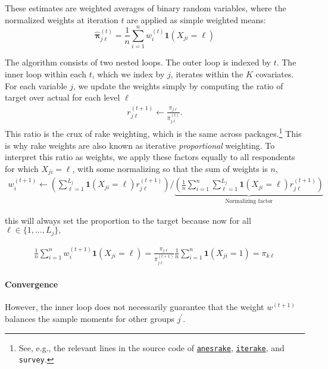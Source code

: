 \documentclass[11pt]{article}
\begin{document}
These estimates are weighted averages of binary random variables, where the normalized weights at iteration \(t\) are applied as simple weighted means:
\[\bm{\widehat{\pi}}^{(t)}_{j\ell} = \frac{1}{n}\sum^n_{i=1}w_i^{(t)} \mathbf{1}(X_{ji} = \ell)\]

The algorithm consists of two nested loops. The outer loop is indexed by \(t\). The inner loop within each \(t\), which we index by \(j\), iterates within the \(K\) covariates. For each variable \(j\), we update the weights simply by computing the ratio of target over actual for each level \(\ell\)
\begin{align}
r_{j\ell}^{(t+1)} \leftarrow \frac{\pi_{j\ell}}{\widehat{\pi}^{(t)}_{j\ell}}.
\end{align}
This ratio is the crux of rake weighting, which is the same across packages.\footnote{See, e.g.,  the relevant lines in the source code of \href{https://github.com/cran/anesrake/blob/cb086d4f1712d71458e86c710b0e88343e06d567/R/rakeonvar.factor.R\#L38-L40}{\texttt{anesrake}}, \href{https://github.com/ttrodrigz/iterake/blob/181fcd2cef936533934a5bc7aefe0011b9b2ef41/R/iterake.R\#L263}{\texttt{iterake}}, and {\texttt{survey}}.}  This is why rake weights are also known as iterative \emph{proportional} weighting. To interpret this ratio as weights, we apply these factors equally to all respondents for which \(X_{ji} = \ell\), with some normalizing so that the sum of weights is \(n\),
\begin{align}
w_i^{(t+1)} \leftarrow \left(\sum^{L_j}_{\ell = 1}\mathbf{1}(X_{ji} = \ell)r_{j\ell}^{(t+1)}\right) \bigg / \underbrace{\left(\frac{1}{n}\sum^n_{i=1}\sum^{L_j}_{\ell = 1}\mathbf{1}(X_{ji} = \ell)r_{j\ell}^{(t+1)}\right)}_{\text{Normalizing factor}}
\end{align}

this will always set the proportion to the target because now for all \( \ell \in \{1, ..., L_j\},\)

\begin{align}
\frac{1}{n}\sum^n_{i=1}w_i^{(t+1)} \mathbf{1}(X_{ji} = \ell) =\frac{\pi_{j\ell}}{\widehat{\pi}^{(t+1)}_{j\ell}}\frac{1}{n}\sum^n_{i=1}\mathbf{1}(X_{ji} = 1) = \pi_{k\ell}
\end{align}

\paragraph{Convergence}
However, the inner loop does not necessarily guarantee that the weight \(w^{(t+1)}\) balances the sample moments for other groups \(j^{\prime}\).
\end{document}
